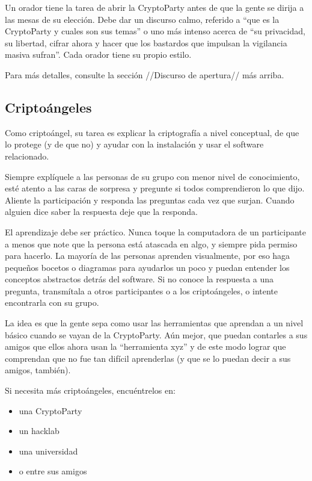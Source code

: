 \documentclass[10pt,a5paper,twoside,,]{book}
\providecommand{\tightlist}{%
  \setlength{\itemsep}{0pt}\setlength{\parskip}{0pt}}
\begin{document}
Un orador tiene la tarea de abrir la CryptoParty antes de que la gente
se dirija a las mesas de su elección. Debe dar un discurso calmo,
referido a ``que es la CryptoParty y cuales son sus temas'' o uno más
intenso acerca de ``su privacidad, su libertad, cifrar ahora y hacer que
los bastardos que impulsan la vigilancia masiva sufran''. Cada orador
tiene su propio estilo.

Para más detalles, consulte la sección //Discurso de apertura// más
arriba.

\subsection{Criptoángeles}\label{criptouxe1ngeles}

Como criptoángel, su tarea es explicar la criptografía a nivel
conceptual, de que lo protege (y de que no) y ayudar con la instalación
y usar el software relacionado.

Siempre explíquele a las personas de su grupo con menor nivel de
conocimiento, esté atento a las caras de sorpresa y pregunte si todos
comprendieron lo que dijo. Aliente la participación y responda las
preguntas cada vez que surjan. Cuando alguien dice saber la respuesta
deje que la responda.

El aprendizaje debe ser práctico. Nunca toque la computadora de un
participante a menos que note que la persona está atascada en algo, y
siempre pida permiso para hacerlo. La mayoría de las personas aprenden
visualmente, por eso haga pequeños bocetos o diagramas para ayudarlos un
poco y puedan entender los conceptos abstractos detrás del software. Si
no conoce la respuesta a una pregunta, transmítala a otros participantes
o a los criptoángeles, o intente encontrarla con su grupo.

La idea es que la gente sepa como usar las herramientas que aprendan a
un nivel básico cuando se vayan de la CryptoParty. Aún mejor, que puedan
contarles a sus amigos que ellos ahora usan la ``herramienta xyz'' y de
este modo lograr que comprendan que no fue tan difícil aprenderlas (y
que se lo puedan decir a sus amigos, también).

Si necesita más criptoángeles, encuéntrelos en:

\begin{itemize}
\tightlist
\item
  una CryptoParty
\item
  un hacklab
\item
  una universidad
\item
  o entre sus amigos
\end{itemize}
\end{document}
